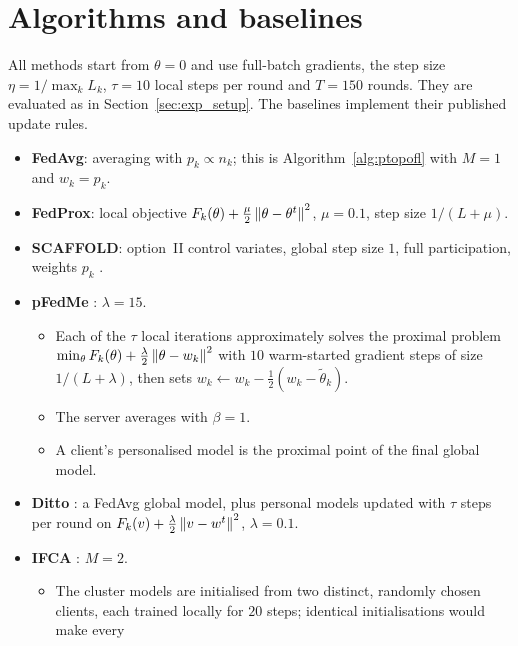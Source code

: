 \section{Algorithms and baselines}
\label{app:baselines}
All methods start from $\theta=0$ and use full-batch gradients, the step size
$\eta=1/\max_kL_k$, $\tau=10$ local steps per round and $T=150$ rounds. They are
evaluated as in Section~\ref{sec:exp_setup}. The baselines implement their published
update rules.
\begin{itemize}[leftmargin=1.2em,itemsep=2pt]
  \item \textbf{FedAvg}: averaging with $p_k\propto n_k$; this is Algorithm~\ref{alg:ptopofl} with $M=1$ and $w_k=p_k$.
  \item \textbf{FedProx}: local objective $F_k(\theta)+\frac{\mu}{2}\left\lVert \theta-\theta^t \right\rVert^2$, $\mu=0.1$, step size $1/(L+\mu)$.
  \item \textbf{SCAFFOLD}: option~II control variates, global step size $1$, full participation, weights $p_k$ \citep{karimireddy2020scaffold}.
  \item \textbf{pFedMe} \citep{t2020personalized}: $\lambda=15$.
    \begin{itemize}[leftmargin=1.2em,itemsep=1pt]
      \item Each of the $\tau$ local iterations approximately solves the proximal problem
        $\min_\theta F_k(\theta)+\frac\lambda2\left\lVert \theta-w_k \right\rVert^2$ with $10$ warm-started
        gradient steps of size $1/(L+\lambda)$, then sets
        $w_k\gets w_k-\tfrac12(w_k-\tilde\theta_k)$.
      \item The server averages with $\beta=1$.
      \item A client's personalised model is the proximal point of the final global model.
    \end{itemize}
  \item \textbf{Ditto} \citep{li2021ditto}: a FedAvg global model, plus personal models
    updated with $\tau$ steps per round on $F_k(v)+\frac{\lambda}{2}\left\lVert v-w^t \right\rVert^2$,
    $\lambda=0.1$.
  \item \textbf{IFCA} \citep{ghosh2020efficient}: $M=2$.
    \begin{itemize}[leftmargin=1.2em,itemsep=1pt]
      \item The cluster models are initialised from two distinct, randomly chosen clients,
        each trained locally for $20$ steps; identical initialisations would make every

\end{itemize}
\end{itemize}
